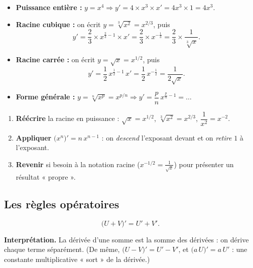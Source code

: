 \documentclass[11pt,a4paper]{article}
\begin{document}
\begin{exemple}
\begin{itemize}[leftmargin=1.5em,topsep=2pt,itemsep=4pt]
  \item \textbf{Puissance entière :} $y=x^4 \Rightarrow y'=4\times x^{3}\times x' = 4x^3\times 1 = 4x^3.$
  \item \textbf{Racine cubique :} on écrit $y=\sqrt[3]{x^2}=x^{2/3}$, puis
  \[
     y'=\frac{2}{3}\times x^{\frac{2}{3}-1}\times x'
       =\frac{2}{3}\times x^{-\frac13}
       =\frac{2}{3}\times\frac{1}{\sqrt[3]{x}}.
  \]
  \item \textbf{Racine carrée :} on écrit $y=\sqrt{x}=x^{1/2}$, puis
  \[
     y'=\frac12\,x^{\frac12-1}\,x'=\frac12\,x^{-\frac12}=\frac{1}{2\sqrt{x}}.
  \]
  \item \textbf{Forme générale :} $y=\sqrt[n]{x^{p}}=x^{p/n}\Rightarrow y'=\dfrac{p}{n}\,x^{\frac{p}{n}-1}=\dots$
\end{itemize}
\end{exemple}

\begin{commentfaire}
\begin{enumerate}[leftmargin=1.8em,topsep=2pt,itemsep=2pt]
  \item \textbf{Réécrire} la racine en puissance : $\sqrt{x}=x^{1/2}$, $\sqrt[3]{x^2}=x^{2/3}$,
        $\dfrac{1}{x^2}=x^{-2}$.
  \item \textbf{Appliquer} $\big(x^n\big)'=n\,x^{n-1}$ : on \emph{descend} l'exposant devant et on
        \emph{retire} $1$ à l'exposant.
  \item \textbf{Revenir} si besoin à la notation racine ($x^{-1/2}=\tfrac{1}{\sqrt{x}}$) pour présenter
        un résultat « propre ».
\end{enumerate}
\end{commentfaire}

\subsection{Les règles opératoires}

\begin{formule}
\[
   \big(U+V\big)' = U'+V'.
\]
\end{formule}
\noindent \textbf{Interprétation.} La dérivée d'une somme est la somme des dérivées : on dérive chaque
terme séparément. (De même, $\big(U-V\big)'=U'-V'$, et $\big(a\,U\big)'=a\,U'$ : une constante
multiplicative « sort » de la dérivée.)
\end{document}
